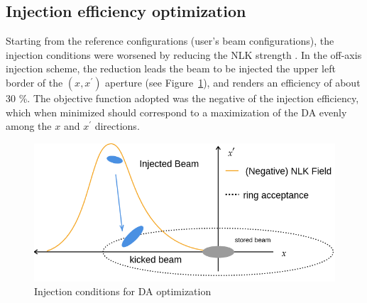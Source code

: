 \documentclass[a4paper,11pt]{article}
\begin{document}
\subsection{Injection efficiency optimization}
Starting from the reference configurations (user's beam configurations), the injection conditions were worsened by reducing the NLK strength
. In the off-axis injection scheme, the reduction leads the beam to be injected the upper left border of the  $(x,x^\prime)$ aperture (see Figure~\ref{fig:inj_cond}), and renders an efficiency of about 30 \%. The objective function adopted was the negative of the injection efficiency, which when minimized should correspond to a maximization of the DA evenly among the $x$ and $x^{\prime}$ directions.
\begin{figure}[h]
    \centering
    \includegraphics[width=0.7\columnwidth]{inj_cond.png}
    \caption{Injection conditions for DA optimization}
    \label{fig:inj_cond}
\end{figure}
\end{document}
